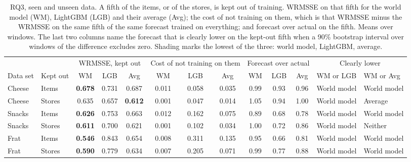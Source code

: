 \begin{table}[t]
\centering\footnotesize\setlength{\tabcolsep}{3pt}
\caption{RQ3, seen and unseen data. A fifth of the items, or of the stores, is kept out of training. WRMSSE on that
fifth for the world model (WM), LightGBM (LGB) and their average (Avg); the cost of not training on them, which is that
WRMSSE minus the WRMSSE on the same fifth of the same forecast trained on everything; and forecast over actual on the
fifth. Means over windows. The last two columns name the forecast that is clearly lower on the kept-out fifth when a
90\% bootstrap interval over windows of the difference excludes zero. Shading marks the lowest of the three: \colorbox{wmcell}{world model}, \colorbox{lgbcell}{LightGBM}, \colorbox{avgcell}{average}.}
\label{tab:rq-transfer}
\begin{adjustbox}{max width=\textwidth}\begin{tabular}{ll ccc ccc ccc ll}
\toprule
 & & \multicolumn{3}{c}{WRMSSE, kept out} & \multicolumn{3}{c}{Cost of not training on them} & \multicolumn{3}{c}{Forecast over actual} & \multicolumn{2}{c}{Clearly lower}\\
\cmidrule(lr){3-5}\cmidrule(lr){6-8}\cmidrule(lr){9-11}\cmidrule(lr){12-13}
Data set & Kept out & WM & LGB & Avg & WM & LGB & Avg & WM & LGB & Avg & WM or LGB & WM or Avg\\
\midrule
Cheese & Items & \cellcolor{wmcell}\textbf{0.678} & 0.731 & 0.687 & 0.011 & 0.058 & 0.035 & 0.99 & 0.93 & 0.96 & \cellcolor{wmcell}World model & \cellcolor{wmcell}World model \\
Cheese & Stores & 0.635 & 0.657 & \cellcolor{avgcell}\textbf{0.612} & 0.001 & 0.047 & 0.014 & 1.05 & 0.94 & 1.00 & \cellcolor{wmcell}World model & \cellcolor{avgcell}Average \\
Snacks & Items & \cellcolor{wmcell}\textbf{0.626} & 0.753 & 0.663 & 0.012 & 0.162 & 0.075 & 0.89 & 0.68 & 0.78 & \cellcolor{wmcell}World model & \cellcolor{wmcell}World model \\
Snacks & Stores & \cellcolor{wmcell}\textbf{0.611} & 0.700 & 0.621 & 0.001 & 0.102 & 0.034 & 1.00 & 0.72 & 0.86 & \cellcolor{wmcell}World model & Neither \\
Frat & Items & \cellcolor{wmcell}\textbf{0.546} & 0.843 & 0.654 & 0.008 & 0.311 & 0.135 & 0.95 & 0.66 & 0.81 & \cellcolor{wmcell}World model & \cellcolor{wmcell}World model \\
Frat & Stores & \cellcolor{wmcell}\textbf{0.590} & 0.779 & 0.634 & 0.007 & 0.205 & 0.071 & 0.99 & 0.77 & 0.88 & \cellcolor{wmcell}World model & \cellcolor{wmcell}World model \\

\end{tabular}
\end{adjustbox}
\end{table}
